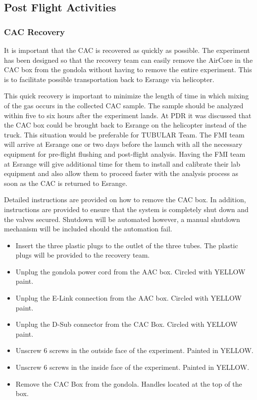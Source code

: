 \documentclass[a4paper,12pt,twoside]{article}
\begin{document}
\subsection{Post Flight Activities}

\subsubsection{CAC Recovery}
It is important that the CAC is recovered as quickly as possible. The experiment has been designed so that the recovery team can easily remove the AirCore in the CAC box from the gondola without having to remove the entire experiment. This is to facilitate possible transportation back to Esrange via helicopter.

This quick recovery is important to minimize the length of time in which mixing of the gas occurs in the collected CAC sample. The sample should be analyzed within five to six hours after the experiment lands. At PDR it was discussed that the CAC box could be brought back to Esrange on the helicopter instead of the truck. This situation would be preferable for TUBULAR Team. 
The FMI team will arrive at Esrange one or two days before the launch with all the necessary equipment for pre-flight flushing and post-flight analysis. Having the FMI team at Esrange will give additional time for them to install and calibrate their lab equipment and also allow them to proceed faster with the analysis process as soon as the CAC is returned to Esrange. 

Detailed instructions are provided on how to remove the CAC box. In addition, instructions are provided to ensure that the system is completely shut down and the valves secured. Shutdown will be automated however, a manual shutdown mechanism will be included should the automation fail.

\label{sec:recovery-checklist}

\begin{itemize}
    \item Insert the three plastic plugs to the outlet of the three tubes. The plastic plugs will be provided to the recovery team. 
    \item Unplug the gondola power cord from the AAC box. Circled with YELLOW paint.
    \item Unplug the E-Link connection from the AAC box. Circled with YELLOW paint.
    \item Unplug the D-Sub connector from the CAC Box. Circled with YELLOW paint.
    \item Unscrew 6 screws in the outside face of the experiment. Painted in YELLOW.
    \item Unscrew 6 screws in the inside face of the experiment. Painted in YELLOW.
    \item Remove the CAC Box from the gondola. Handles located at the top of the box. 
\end{itemize}
\end{document}
